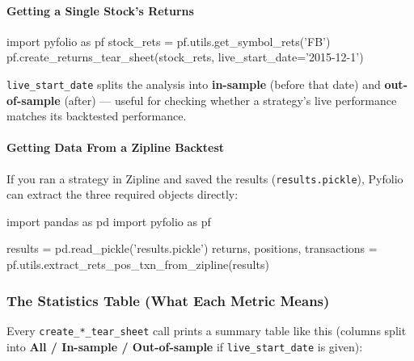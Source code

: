 \documentclass[12pt,openany]{book}
\theoremstyle{definition}
\theoremstyle{remark}
\begin{document}
\paragraph{Getting a Single Stock's Returns}

\begin{python}
import pyfolio as pf
stock_rets = pf.utils.get_symbol_rets('FB')
pf.create_returns_tear_sheet(stock_rets, live_start_date='2015-12-1')
\end{python}

\texttt{live\_start\_date} splits the analysis into \textbf{in-sample} (before that date) and \textbf{out-of-sample} (after) — useful for checking whether a strategy's live performance matches its backtested performance.

\paragraph{Getting Data From a Zipline Backtest}

If you ran a strategy in Zipline and saved the results (\texttt{results.pickle}), Pyfolio can extract the three required objects directly:

\begin{python}
import pandas as pd
import pyfolio as pf

results = pd.read_pickle('results.pickle')
returns, positions, transactions = pf.utils.extract_rets_pos_txn_from_zipline(results)
\end{python}
\subsubsection{The Statistics Table (What Each Metric Means)}

Every \texttt{create\_*\_tear\_sheet} call prints a summary table like this (columns split into \textbf{All / In-sample / Out-of-sample} if \texttt{live\_start\_date} is given):
\end{document}
